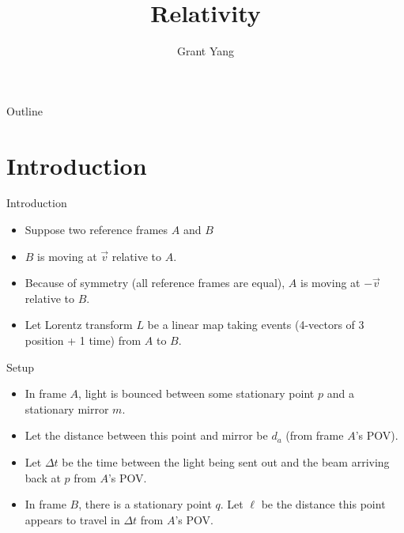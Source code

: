 \documentclass{beamer}
\title[Your Short Title]{Relativity}
\author{Grant Yang}
\institute{}
\date{}
\begin{document}
\begin{frame}
  \titlepage
\end{frame}

\begin{frame}{Outline}
  \tableofcontents
\end{frame}

\section{Introduction}

\begin{frame}{Introduction}

\begin{itemize}
    \item Suppose two reference frames $A$ and $B$
    \item $B$ is moving at $\vec{v}$ relative to $A$.
    \item Because of symmetry (all reference frames are equal), $A$ is moving at $-\vec{v}$ relative to $B$.
    \item Let Lorentz transform $L$ be a linear map taking events (4-vectors of 3 position + 1 time) from $A$ to $B$.
\end{itemize}

\end{frame}

\begin{frame}{Setup}
\begin{itemize}
\item In frame $A$, light is bounced between some stationary point $p$ and a stationary mirror $m$.
\item Let the distance between this point and mirror be $d_a$ (from frame $A$'s POV).
\item Let $\Delta t$ be the time between the light being sent out and the beam arriving back at $p$ from $A$'s POV.
\item In frame $B$, there is a stationary point $q$. Let $\ell$ be the distance this point appears to travel in $\Delta t$ from $A$'s POV.
\end{itemize}
\end{frame}
\end{document}
